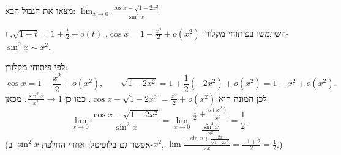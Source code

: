 
\begin{question}
מצאו את הגבול הבא:
$\displaystyle\lim_{x\to0}\frac{\cos x-\sqrt{1-2x^2}}{\sin^2x}$
\end{question}

\begin{hint}
השתמשו בפיתוחי מקלורן $\cos x=1-\frac{x^2}2+o(x^2)$, $\sqrt{1+t}=1+\frac t2+o(t)$, ו-$\sin^2x\sim x^2$.
\end{hint}

\begin{solution}
לפי פיתוחי מקלורן:
\[ \cos x=1-\frac{x^2}{2}+o(x^2),\qquad \sqrt{1-2x^2}=1+\frac12(-2x^2)+o(x^2)=1-x^2+o(x^2). \]
לכן המונה הוא $\cos x-\sqrt{1-2x^2}=\frac{x^2}{2}+o(x^2)$. כמו כן $\frac{\sin^2x}{x^2}\to1$. מכאן
\[ \lim_{x\to0}\frac{\cos x-\sqrt{1-2x^2}}{\sin^2x}=\lim_{x\to0}\frac{\frac12+\frac{o(x^2)}{x^2}}{\frac{\sin^2x}{x^2}}=\frac12. \]
(אפשר גם בלופיטל: אחרי החלפת $\sin^2x$ ב-$x^2$, $\lim\frac{-\sin x+\frac{2x}{\sqrt{1-2x^2}}}{2x}=\frac{-1+2}{2}=\frac12$.)
\end{solution}
